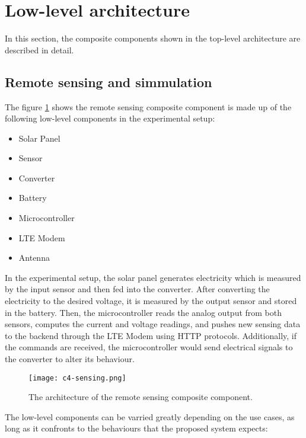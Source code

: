 \documentclass[../thesis.tex]{subfiles}
\begin{document}
\section{Low-level architecture}

In this section, the composite components shown in the top-level architecture are described in detail. 

\subsection{Remote sensing and simmulation}
\label{sec:remoteSensing}
\label{sec:simulator}

The figure \ref{fig:sensing} shows the remote sensing composite component is made up of the following low-level components in the experimental setup:

\begin{itemize}
	\item Solar Panel
	\item Sensor
	\item Converter
	\item Battery
	\item Microcontroller
	\item LTE Modem
	\item Antenna
\end{itemize}

In the experimental setup, the solar panel generates electricity which is measured by the input sensor and then fed into the converter. After converting the electricity to the desired voltage, it is measured by the output sensor and stored in the battery. Then, the microcontroller reads the analog output from both sensors, computes the current and voltage readings, and pushes new sensing data to the backend through the LTE Modem using HTTP protocols. Additionally, if the commands are received, the microcontroller would send electrical signals to the converter to alter its behaviour.

\begin{figure}[!ht]
	\centering
	\texttt{[image: c4-sensing.png]}
	\caption{The architecture of the remote sensing composite component.}
	\label{fig:sensing}
\end{figure}


The low-level components can be varried greatly depending on the use cases, as long as it confronts to the behaviours that the proposed system expects:
\end{document}
